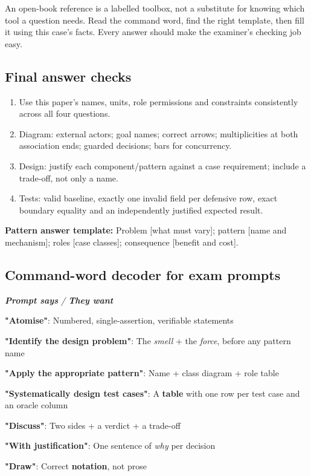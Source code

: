 

\begin{studycolumns}
\vspace{0pt}
\begin{eli5box}
An open-book reference is a labelled toolbox, not a substitute for knowing which tool a question needs. Read the command word, find the right template, then fill it using this case's facts. Every answer should make the examiner's checking job easy.
\end{eli5box}

\subsection*{Final answer checks}
\begin{enumerate}
\item Use this paper's names, units, role permissions and constraints consistently across all four questions.
\item Diagram: external actors; goal names; correct arrows; multiplicities at both association ends; guarded decisions; bars for concurrency.
\item Design: justify each component/pattern against a case requirement; include a trade-off, not only a name.
\item Tests: valid baseline, exactly one invalid field per defensive row, exact boundary equality and an independently justified expected result.
\end{enumerate}
\textbf{Pattern answer template:} Problem [what must vary]; pattern [name and mechanism]; roles [case classes]; consequence [benefit and cost].
\subsection*{Command-word decoder for exam prompts}

\begin{referenceentries}
\textit{\textbf{Prompt says} / \textbf{They want}}\par\smallskip
\noindent \textbf{"Atomise"}: Numbered, single-assertion, verifiable statements\par
\noindent \textbf{"Identify the design problem"}: The \emph{smell} + the \emph{force}, before any pattern name\par
\noindent \textbf{"Apply the appropriate pattern"}: Name + class diagram + role table\par
\noindent \textbf{"Systematically design test cases"}: A \textbf{table} with one row per test case and an oracle column\par
\noindent \textbf{"Discuss"}: Two sides + a verdict + a trade-off\par
\noindent \textbf{"With justification"}: One sentence of \emph{why} per decision\par
\noindent \textbf{"Draw"}: Correct \textbf{notation}, not prose\par
\end{referenceentries}

\par\smallskip{\color{line}\hrule}\smallskip
\end{studycolumns}
